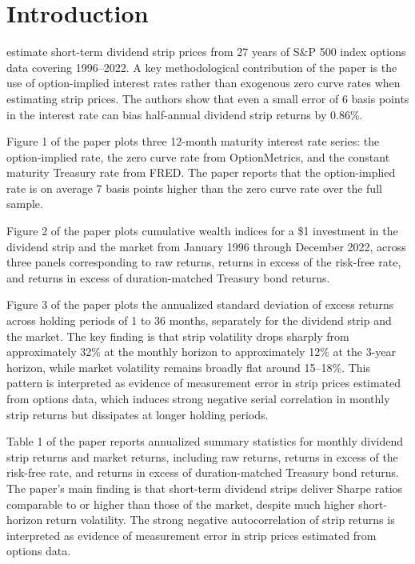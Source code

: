 \documentclass[12pt]{article}
\begin{document}
\begin{titlepage}
\end{titlepage}

\doublespacing

\section{Introduction}

\cite{golez2024holding} estimate short-term dividend strip prices
from 27 years of S\&P 500 index options data covering 1996--2022.
A key methodological contribution of the paper is the use of
option-implied interest rates rather than exogenous zero curve rates
when estimating strip prices.
The authors show that even a small error of 6 basis points in the interest rate
can bias half-annual dividend strip returns by 0.86\%.

Figure 1 of the paper plots three 12-month maturity interest rate series:
the option-implied rate, the zero curve rate from OptionMetrics,
and the constant maturity Treasury rate from FRED.
The paper reports that the option-implied rate is on average 7 basis points
higher than the zero curve rate over the full sample.

Figure 2 of the paper plots cumulative wealth indices for a \$1 investment
in the dividend strip and the market from January 1996 through December 2022,
across three panels corresponding to raw returns, returns in excess of the
risk-free rate, and returns in excess of duration-matched Treasury bond returns.

Figure 3 of the paper plots the annualized standard deviation of excess
returns across holding periods of 1 to 36 months, separately for
the dividend strip and the market.
The key finding is that strip volatility drops sharply from approximately 32\%
at the monthly horizon to approximately 12\% at the 3-year horizon,
while market volatility remains broadly flat around 15--18\%.
This pattern is interpreted as evidence of measurement error in strip prices
estimated from options data, which induces strong negative serial correlation
in monthly strip returns but dissipates at longer holding periods.

Table 1 of the paper reports annualized summary statistics for monthly
dividend strip returns and market returns, including raw returns,
returns in excess of the risk-free rate, and returns in excess of
duration-matched Treasury bond returns.
The paper's main finding is that short-term dividend strips deliver
Sharpe ratios comparable to or higher than those of the market,
despite much higher short-horizon return volatility.
The strong negative autocorrelation of strip returns is interpreted
as evidence of measurement error in strip prices estimated from options data.
\end{document}
